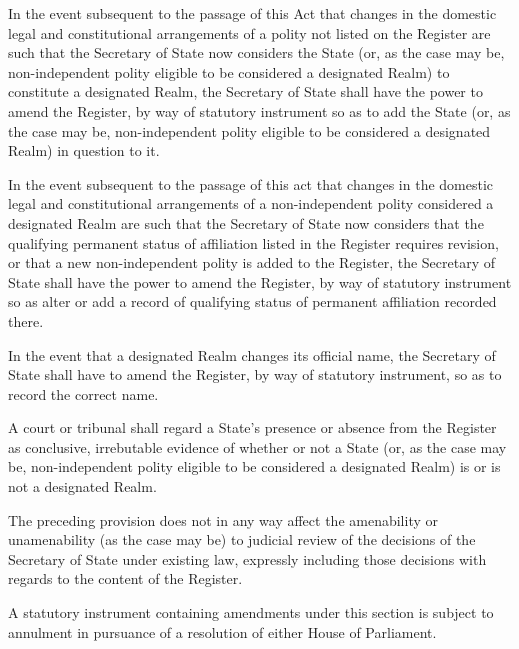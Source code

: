 \documentclass{ukbill}
\begin{document}
\begin{numstat}
\item  	In the event subsequent to the passage of this Act that changes in the domestic legal and constitutional arrangements of a polity not listed on the Register are such that the Secretary of State now considers the State (or, as the case may be, non-independent polity eligible to be considered a designated Realm) to constitute a designated Realm, the Secretary of State shall have the power to amend the Register, by way of statutory instrument  so as to add the State (or, as the case may be, non-independent polity eligible to be considered a designated Realm) in question to it.

\item  	In the event subsequent to the passage of this act that changes in the domestic legal and constitutional arrangements of a non-independent polity considered a designated Realm are such that the Secretary of State now considers that the qualifying permanent status of affiliation listed in the Register requires revision, or that a new non-independent polity is added to the Register, the Secretary of State shall have the power to amend the Register, by way of statutory instrument  so as alter or add a record of qualifying status of permanent affiliation recorded there. 
\item In the event that a designated Realm changes its official name, the Secretary of State shall have to amend the Register, by way of statutory instrument, so as to record the correct name.
\item A court or tribunal shall regard a State's presence or absence from the Register as conclusive, irrebutable  evidence of whether or not a State (or, as the case may be, non-independent polity eligible to be considered a designated Realm) is or is not a designated Realm.
\begin{alphstat}
\item  The preceding provision does not in any way affect the amenability or unamenability (as the case may be) to judicial review of the decisions of the Secretary of State under existing law, expressly including those decisions with regards to the content of the Register.  
  \end{alphstat}
\item A statutory instrument containing amendments under this section is subject to annulment in pursuance of a resolution of either House of Parliament.
	 \end{numstat}
	 
	 
 
\end{document}
